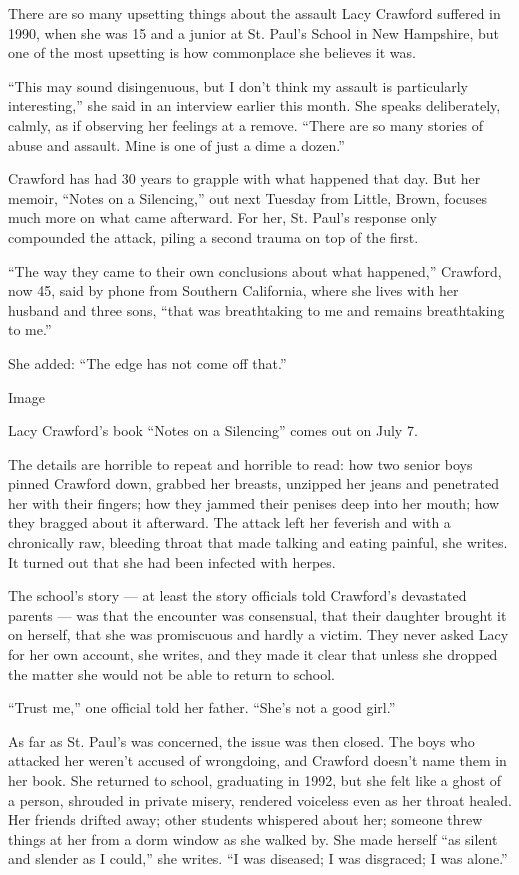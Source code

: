 There are so many upsetting things about the assault Lacy Crawford
suffered in 1990, when she was 15 and a junior at St. Paul's School in
New Hampshire, but one of the most upsetting is how commonplace she
believes it was.

``This may sound disingenuous, but I don't think my assault is
particularly interesting,'' she said in an interview earlier this month.
She speaks deliberately, calmly, as if observing her feelings at a
remove. ``There are so many stories of abuse and assault. Mine is one of
just a dime a dozen.''

Crawford has had 30 years to grapple with what happened that day. But
her memoir, ``Notes on a Silencing,'' out next Tuesday from Little,
Brown, focuses much more on what came afterward. For her, St. Paul's
response only compounded the attack, piling a second trauma on top of
the first.

``The way they came to their own conclusions about what happened,''
Crawford, now 45, said by phone from Southern California, where she
lives with her husband and three sons, ``that was breathtaking to me and
remains breathtaking to me.''

She added: ``The edge has not come off that.''

Image

Lacy Crawford's book ``Notes on a Silencing'' comes out on July 7.

The details are horrible to repeat and horrible to read: how two senior
boys pinned Crawford down, grabbed her breasts, unzipped her jeans and
penetrated her with their fingers; how they jammed their penises deep
into her mouth; how they bragged about it afterward. The attack left her
feverish and with a chronically raw, bleeding throat that made talking
and eating painful, she writes. It turned out that she had been infected
with herpes.

The school's story --- at least the story officials told Crawford's
devastated parents --- was that the encounter was consensual, that their
daughter brought it on herself, that she was promiscuous and hardly a
victim. They never asked Lacy for her own account, she writes, and they
made it clear that unless she dropped the matter she would not be able
to return to school.

``Trust me,'' one official told her father. ``She's not a good girl.''

As far as St. Paul's was concerned, the issue was then closed. The boys
who attacked her weren't accused of wrongdoing, and Crawford doesn't
name them in her book. She returned to school, graduating in 1992, but
she felt like a ghost of a person, shrouded in private misery, rendered
voiceless even as her throat healed. Her friends drifted away; other
students whispered about her; someone threw things at her from a dorm
window as she walked by. She made herself ``as silent and slender as I
could,'' she writes. ``I was diseased; I was disgraced; I was alone.''


